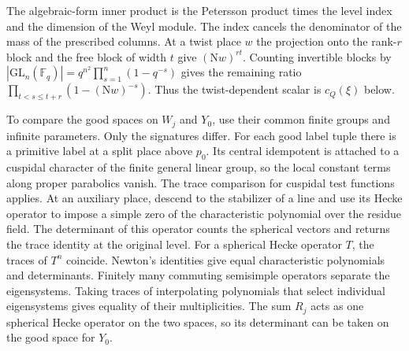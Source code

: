 The algebraic-form inner product is the Petersson product times the
level index and the dimension of the Weyl module. The index cancels
the denominator of the mass of the prescribed columns.
At a twist place \(w\) the projection onto the rank-\(r\) block and the
free block of width \(t\) give \((\mathrm Nw)^{rt}\).
Counting invertible blocks by
\(|\mathrm{GL}_n(\mathbb F_q)|=q^{n^2}\prod_{s=1}^n(1-q^{-s})\)
gives the remaining ratio \(\prod_{t<s\le t+r}(1-(\mathrm Nw)^{-s})\).
Thus the twist-dependent scalar is \(c_Q(\xi)\) below.

To compare the good spaces on \(W_j\) and \(Y_0\), use their common
finite groups and infinite parameters. Only the signatures differ.
For each good label tuple there is a primitive label at a split
place above \(p_0\). Its central idempotent is attached to a cuspidal
character of the finite general linear group, so the local constant
terms along proper parabolics vanish. The trace comparison for
cuspidal test functions applies. At an auxiliary place, descend
to the stabilizer of a line and use its Hecke operator to impose a
simple zero of the characteristic polynomial over the residue field.
The determinant of this operator counts the spherical vectors and
returns the trace identity at the original level.
For a spherical Hecke operator \(T\), the traces of \(T^n\) coincide.
Newton's identities give equal characteristic polynomials and
determinants. Finitely many commuting semisimple operators separate
the eigensystems. Taking traces of interpolating polynomials that
select individual eigensystems gives equality of their multiplicities.
The sum \(R_j\) acts as one spherical Hecke operator on the two spaces,
so its determinant can be taken on the good space for \(Y_0\).
